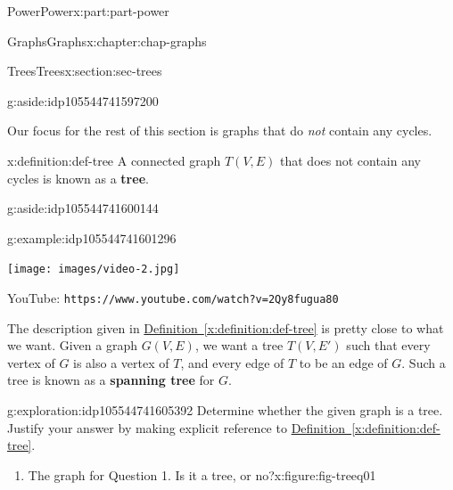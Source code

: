 \documentclass[oneside,10pt,]{book}
\newcommand{\xreffont}{\relax}
\newcommand{\mono}[1]{\texttt{#1}}
\newcommand{\terminology}[1]{\textbf{#1}}
\numberwithin{equation}{section}
\newlength{\qrsize}
\newlength{\previewwidth}
\begin{document}
\begin{partptx}{Power}{}{Power}{}{}{x:part:part-power}
\begin{chapterptx}{Graphs}{}{Graphs}{}{}{x:chapter:chap-graphs}
\begin{sectionptx}{Trees}{}{Trees}{}{}{x:section:sec-trees}
\begin{aside}{}{g:aside:idp105544741597200}
\end{aside}
%
\par
Our focus for the rest of this section is graphs that do \emph{not} contain any cycles.%
\begin{definition}{}{x:definition:def-tree}%
%
A connected graph \(T(V,E)\) that does not contain any cycles is known as a \terminology{tree}. \begin{aside}{}{g:aside:idp105544741600144}%
\end{aside}
%
\end{definition}
\begin{example}{}{g:example:idp105544741601296}%
\setlength{\qrsize}{9em}
\setlength{\previewwidth}{\linewidth}
\addtolength{\previewwidth}{-\qrsize}
\begin{tcbraster}[raster columns=2, raster column skip=1pt, raster halign=center, raster force size=false, raster left skip=0pt, raster right skip=0pt]%
\begin{tcolorbox}[previewstyle, width=\previewwidth]%
\texttt{[image: images/video-2.jpg]}%
\end{tcolorbox}%
\begin{tcolorbox}[qrstyle]%
{\hypersetup{urlcolor=black}}%
\end{tcolorbox}%
\begin{tcolorbox}[captionstyle]%
\small YouTube: \mono{https://www.youtube.com/watch?v=2Qy8fugua80}\end{tcolorbox}%
\end{tcbraster}%
\end{example}
The description given in \hyperref[x:definition:def-tree]{Definition~{\xreffont\ref{x:definition:def-tree}}} is pretty close to what we want. Given a graph \(G(V,E)\), we want a tree \(T(V,E')\) such that every vertex of \(G\) is also a vertex of \(T\), and every edge of \(T\) to be an edge of \(G\). Such a tree is known as a \terminology{spanning tree} for \(G\).%
\begin{exploration}{}{g:exploration:idp105544741605392}%
Determine whether the given graph is a tree. Justify your answer by making explicit reference to \hyperref[x:definition:def-tree]{Definition~{\xreffont\ref{x:definition:def-tree}}}.%
%
\begin{enumerate}
\item{}\begin{figureptx}{The graph for Question 1. Is it a tree, or no?}{x:figure:fig-treeq01}{}%
\begin{image}{0.25}{0.5}{0.25}%

\end{image}
\end{figureptx}
\end{enumerate}
\end{exploration}
\end{sectionptx}
\end{chapterptx}
\end{partptx}
\end{document}
